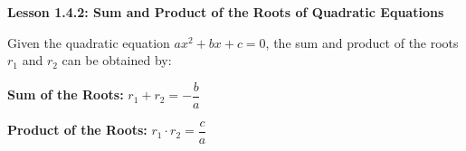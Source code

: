 \begin{center}
\textbf{Lesson 1.4.2: Sum and Product of the Roots of Quadratic Equations}
\end{center}

\vspace*{1ex}

\noindent Given the quadratic equation $ ax^2 + bx + c = 0 $, the sum and product of the roots $r_1$ and $r_2$ can be obtained by: 

\textbf{Sum of the Roots:}  
$ r_1 + r_2 = -\dfrac{b}{a}$

\textbf{Product of the Roots:} $ r_1 \cdot r_2 = \dfrac{c}{a}$

